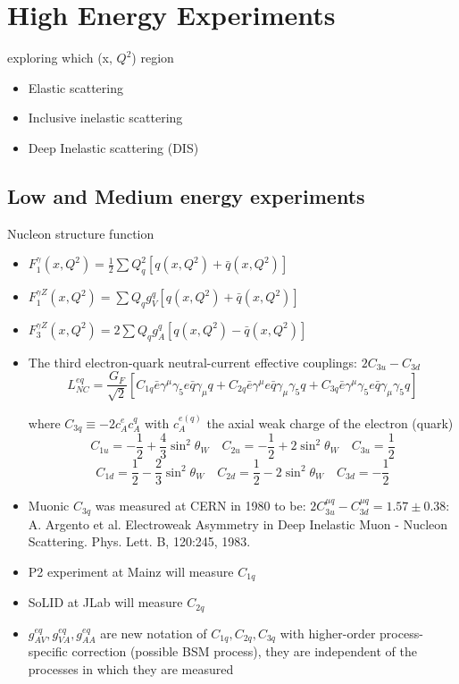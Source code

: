 \documentclass{report}
\begin{document}
\section{High Energy Experiments}

exploring which (x, $Q^2$) region
\begin{itemize}
    \item Elastic scattering
    \item Inclusive inelastic scattering
    \item Deep Inelastic scattering (DIS)
\end{itemize}


\subsection{Low and Medium energy experiments}
Nucleon structure function
\begin{itemize}
    \item $F_1^\gamma(x, Q^2) = \frac{1}{2}\sum Q_q^2 \left[q(x, Q^2) + \bar{q}(x, Q^2)\right]$
    \item $F_1^{\gamma Z}(x, Q^2) = \sum Q_q g_V^q \left[q(x, Q^2) + \bar{q}(x, Q^2)\right]$
    \item $F_3^{\gamma Z}(x, Q^2) = 2\sum Q_q g_A^q \left[q(x, Q^2) - \bar{q}(x, Q^2)\right]$
    \item The third electron-quark neutral-current effective couplings: $2C_{3u} - C_{3d}$
	$$ L_{NC}^{eq} = \frac{G_F}{\sqrt{2}}\left[ C_{1q}\bar{e}\gamma^{\mu}\gamma_5e\bar{q}\gamma_\mu q 
	+ C_{2q}\bar{e}\gamma^{\mu}e\bar{q}\gamma_\mu\gamma_5q
	+ C_{3q}\bar{e}\gamma^{\mu}\gamma_5e\bar{q}\gamma_\mu\gamma_5q\right]$$

	where $C_{3q} \equiv -2c_A^e c_A^q$ with $c_A^{e(q)}$ the axial weak charge of the electron (quark)
	$$ C_{1u} = -\frac{1}{2} + \frac{4}{3}\sin^2\theta_W    \quad
	C_{2u} = -\frac{1}{2} + 2\sin^2\theta_W \quad
	C_{3u} = \frac{1}{2} 
	$$
	$$ C_{1d} = \frac{1}{2} - \frac{2}{3}\sin^2\theta_W    \quad
	C_{2d} = \frac{1}{2} - 2\sin^2\theta_W \quad
	C_{3d} = -\frac{1}{2} 
	$$
    \item Muonic $C_{3q}$ was measured at CERN in 1980 to be: $2C_{3u}^{\mu q} - C_{3d}^{\mu q} = 1.57 \pm 0.38$: A. Argento et al. Electroweak Asymmetry in Deep Inelastic Muon - Nucleon Scattering.
Phys. Lett. B, 120:245, 1983.
    \item P2 experiment at Mainz will measure $C_{1q}$
    \item SoLID at JLab will measure $C_{2q}$
    \item $g_{AV}^{eq}, g_{VA}^{eq}, g_{AA}^{eq}$ are new notation of $C_{1q}, C_{2q}, C_{3q}$ with higher-order process-specific correction (possible BSM process), they are independent of the processes in which they are measured
\end{itemize}
\end{document}

